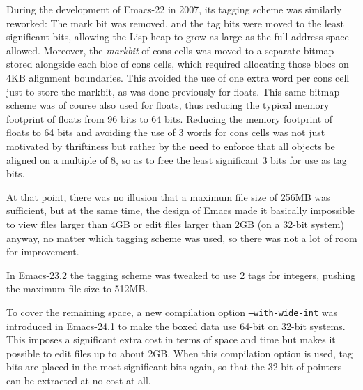 \documentclass[format=acmsmall, review]{acmart}
\begin{document}
During the development of Emacs-22 in 2007, its tagging scheme was
similarly reworked: The mark bit was removed, and the tag bits were
moved to the least significant bits, allowing the Lisp heap to grow as
large as the full address space allowed.
Moreover, the \emph{markbit} of cons cells was moved to a separate bitmap
stored alongside each bloc of cons cells, which required allocating those
blocs on 4KB alignment boundaries.  This avoided the use of one extra word
per cons cell just to store the markbit, as was done previously for floats.
This same bitmap scheme
was of course also used for floats, thus reducing the typical memory footprint of
floats from 96 bits to 64 bits.  Reducing the memory footprint of
floats to 64 bits
and avoiding the use of 3 words for cons cells was not just motivated by
thriftiness but rather by the need to enforce that all objects be aligned on
a multiple of 8, so as to free the least significant 3 bits for use as
tag bits.

At that point, there was no illusion that a maximum file size of 256\;MB was
sufficient, but at the same time, the design of Emacs made it basically
impossible to view files larger than 4GB or edit files larger than 2GB (on
a 32-bit system) anyway, no matter which tagging scheme was used, so there was
not a lot of room for improvement.

In Emacs-23.2 the tagging scheme was tweaked to use 2 tags for integers,
pushing the maximum file size to 512\;MB.

To cover the remaining space, a new compilation option
\texttt{--with-wide-int} was introduced in Emacs-24.1 to make the boxed data
use 64-bit on 32-bit systems.  This imposes a significant extra cost in terms
of space and time but makes it possible to edit files up to about 2GB.
When this compilation option is used, tag bits are placed in the most
significant bits again, so that the 32-bit of pointers can be extracted at no
cost at all.

\end{document}
